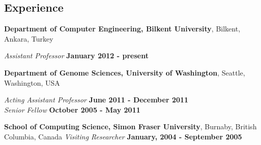 \documentclass[margin,line]{res}
\newcommand{\junk}[1]{}
\begin{document}
\begin{resume}
          \section{\sc Experience}
                  {\bf Department of Computer Engineering, Bilkent University},
                  Bilkent, Ankara, Turkey
                  
                  \vspace{-.2cm}
                         {\em Assistant Professor} \hfill {\bf January 2012 - present} 
                         
                         
                         {\bf Department of Genome Sciences, University of Washington},
                         Seattle, Washington, USA
                         
                         \vspace{-.2cm}
                                {\em Acting Assistant Professor} \hfill {\bf June 2011 - December 2011} \\
                                
                                \vspace{-.2cm}
                                       {\em Senior Fellow} \hfill {\bf October 2005 - May 2011}
                                       
                          {\bf School of Computing Science, Simon Fraser University},
                          Burnaby, British Columbia, Canada
                          \vspace{-.2cm}
                                         {\em Visiting Researcher} \hfill {\bf January, 2004 - September 2005}\\
                                         \junk{
                                         Worked on RNA-RNA interaction algorithms, and RNA secondary structure
                                         motif discovery problems, collaborating with Peter Unrau, Kaizhong
                                         Zhang, and Jeremy Buhler.
                                         }
                                       
                                       
                                       
                                       \junk{
                                         {\bf Department of EECS, Case Western Reserve University},
                                         Cleveland, Ohio, USA
                                         
}
\end{resume}
\end{document}
